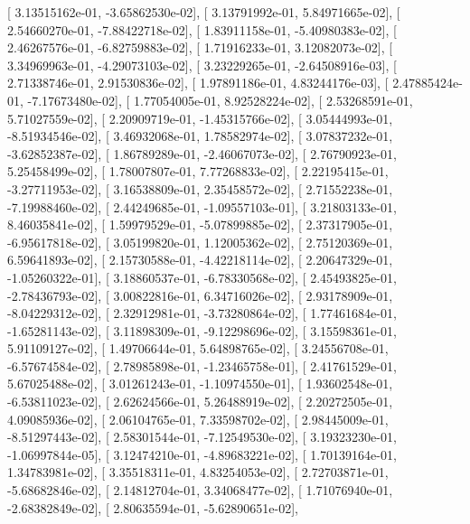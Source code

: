 \documentclass{article}
\begin{document}
       [  3.13515162e-01,  -3.65862530e-02],
       [  3.13791992e-01,   5.84971665e-02],
       [  2.54660270e-01,  -7.88422718e-02],
       [  1.83911158e-01,  -5.40980383e-02],
       [  2.46267576e-01,  -6.82759883e-02],
       [  1.71916233e-01,   3.12082073e-02],
       [  3.34969963e-01,  -4.29073103e-02],
       [  3.23229265e-01,  -2.64508916e-03],
       [  2.71338746e-01,   2.91530836e-02],
       [  1.97891186e-01,   4.83244176e-03],
       [  2.47885424e-01,  -7.17673480e-02],
       [  1.77054005e-01,   8.92528224e-02],
       [  2.53268591e-01,   5.71027559e-02],
       [  2.20909719e-01,  -1.45315766e-02],
       [  3.05444993e-01,  -8.51934546e-02],
       [  3.46932068e-01,   1.78582974e-02],
       [  3.07837232e-01,  -3.62852387e-02],
       [  1.86789289e-01,  -2.46067073e-02],
       [  2.76790923e-01,   5.25458499e-02],
       [  1.78007807e-01,   7.77268833e-02],
       [  2.22195415e-01,  -3.27711953e-02],
       [  3.16538809e-01,   2.35458572e-02],
       [  2.71552238e-01,  -7.19988460e-02],
       [  2.44249685e-01,  -1.09557103e-01],
       [  3.21803133e-01,   8.46035841e-02],
       [  1.59979529e-01,  -5.07899885e-02],
       [  2.37317905e-01,  -6.95617818e-02],
       [  3.05199820e-01,   1.12005362e-02],
       [  2.75120369e-01,   6.59641893e-02],
       [  2.15730588e-01,  -4.42218114e-02],
       [  2.20647329e-01,  -1.05260322e-01],
       [  3.18860537e-01,  -6.78330568e-02],
       [  2.45493825e-01,  -2.78436793e-02],
       [  3.00822816e-01,   6.34716026e-02],
       [  2.93178909e-01,  -8.04229312e-02],
       [  2.32912981e-01,  -3.73280864e-02],
       [  1.77461684e-01,  -1.65281143e-02],
       [  3.11898309e-01,  -9.12298696e-02],
       [  3.15598361e-01,   5.91109127e-02],
       [  1.49706644e-01,   5.64898765e-02],
       [  3.24556708e-01,  -6.57674584e-02],
       [  2.78985898e-01,  -1.23465758e-01],
       [  2.41761529e-01,   5.67025488e-02],
       [  3.01261243e-01,  -1.10974550e-01],
       [  1.93602548e-01,  -6.53811023e-02],
       [  2.62624566e-01,   5.26488919e-02],
       [  2.20272505e-01,   4.09085936e-02],
       [  2.06104765e-01,   7.33598702e-02],
       [  2.98445009e-01,  -8.51297443e-02],
       [  2.58301544e-01,  -7.12549530e-02],
       [  3.19323230e-01,  -1.06997844e-05],
       [  3.12474210e-01,  -4.89683221e-02],
       [  1.70139164e-01,   1.34783981e-02],
       [  3.35518311e-01,   4.83254053e-02],
       [  2.72703871e-01,  -5.68682846e-02],
       [  2.14812704e-01,   3.34068477e-02],
       [  1.71076940e-01,  -2.68382849e-02],
       [  2.80635594e-01,  -5.62890651e-02],
\end{document}
